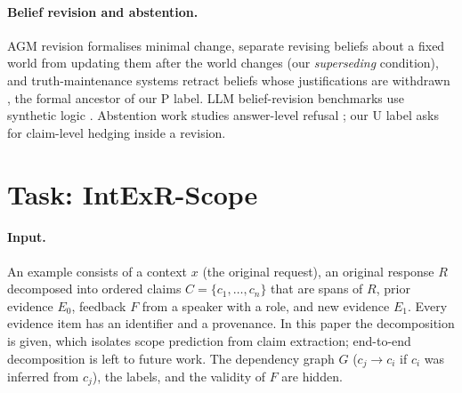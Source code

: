 \documentclass[11pt]{article}
\newcommand{\Pp}{\textsc{P}}
\newcommand{\U}{\textsc{U}}
\begin{document}
\paragraph{Belief revision and abstention.}
AGM revision \citep{alchourron1985agm} formalises minimal change, \citet{katsuno1991update} separate revising beliefs about a fixed world from updating them after the world changes (our \emph{superseding} condition), and truth-maintenance systems retract beliefs whose justifications are withdrawn \citep{doyle1979tms,dekleer1986atms}, the formal ancestor of our \Pp{} label. LLM belief-revision benchmarks use synthetic logic \citep{wilie2024beliefr}. Abstention work studies answer-level refusal \citep{kirichenko2025abstentionbench}; our \U{} label asks for claim-level hedging inside a revision.

\section{Task: IntExR-Scope}
\label{sec:task}
\paragraph{Input.} An example consists of a context $x$ (the original request), an original response $R$ decomposed into ordered claims $C=\{c_1,\dots,c_n\}$ that are spans of $R$, prior evidence $E_0$, feedback $F$ from a speaker with a role, and new evidence $E_1$. Every evidence item has an identifier and a provenance. In this paper the decomposition is given, which isolates scope prediction from claim extraction; end-to-end decomposition is left to future work. The dependency graph $G$ ($c_j\!\to\!c_i$ if $c_i$ was inferred from $c_j$), the labels, and the validity of $F$ are hidden.
\end{document}
